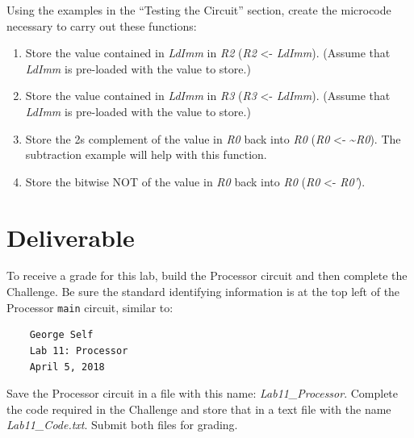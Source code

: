 Using the examples in the ``Testing the Circuit'' section, create the microcode necessary to carry out these functions:

\begin{enumerate}
	\item Store the value contained in \textit{LdImm} in \textit{R2} (\textit{R2} <- \textit{LdImm}). (Assume that \textit{LdImm} is pre-loaded with the value to store.)
	\item Store the value contained in \textit{LdImm} in \textit{R3} (\textit{R3} <- \textit{LdImm}). (Assume that \textit{LdImm} is pre-loaded with the value to store.)
	\item Store the 2s complement of the value in \textit{R0} back into \textit{R0} (\textit{R0} <- \textasciitilde \textit{R0}). The subtraction example will help with this function.
	\item Store the bitwise NOT of the value in \textit{R0} back into \textit{R0} (\textit{R0} <- \textit{R0'}).
\end{enumerate}

\section{Deliverable}

To receive a grade for this lab, build the Processor circuit and then complete the Challenge. Be sure the standard identifying information is at the top left of the Processor \lstinline{main} circuit, similar to: 

\bigskip
\begin{minipage}{\linewidth}
	\begin{verbatim}
	George Self
	Lab 11: Processor
	April 5, 2018
	\end{verbatim}
\end{minipage}
\bigskip

Save the Processor circuit in a file with this name: \textit{Lab11\_Processor}. Complete the code required in the Challenge and store that in a text file with the name \textit{Lab11\_Code.txt}. Submit both files for grading.
